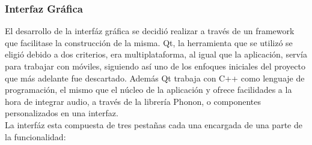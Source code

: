 \subsubsection{Interfaz Gráfica}

El desarrollo de la interfáz gráfica se decidió realizar a través de un framework que facilitase la construcción de la misma. Qt, la herramienta que se utilizó se eligió debido a dos criterios, era multiplataforma, al igual que la aplicación, servía para trabajar con móviles, siguiendo así uno de los enfoques iniciales del proyecto que más adelante fue descartado. Además Qt trabaja con C++ como lenguaje de programación, el mismo que el núcleo de la aplicación y ofrece facilidades a la hora de integrar audio, a través de la librería Phonon, o componentes personalizados en una interfaz.\\
\newline
La interfáz esta compuesta de tres pestañas cada una encargada de una parte de la funcionalidad:

